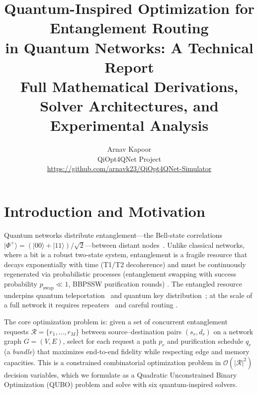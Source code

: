 \documentclass[10pt,a4paper]{article}
\begin{document}
\title{\textbf{Quantum-Inspired Optimization for Entanglement Routing\\
in Quantum Networks: A Technical Report\\
\large Full Mathematical Derivations, Solver Architectures,
and Experimental Analysis}}

\author{Arnav Kapoor\\
QiOpt4QNet Project\\
\url{https://github.com/arnavk23/QiOpt4QNet-Simulator}}

\maketitle

\tableofcontents
\newpage

\section{Introduction and Motivation}
\label{sec:intro}

Quantum networks distribute entanglement---the Bell-state correlations
$|\Phi^+\rangle = (|00\rangle + |11\rangle)/\sqrt{2}$---between distant
nodes~\cite{kimble2008quantum,wehner2018quantum,simon2017towards}.
Unlike classical networks, where a bit is a robust two-state
system, entanglement is a fragile resource that decays exponentially
with time (T1/T2 decoherence) and must be continuously regenerated via
probabilistic processes (entanglement swapping with success probability
$p_{\text{swap}} \ll 1$, BBPSSW purification rounds)
\cite{werner1989quantum,horodecki2009quantum}.  The entangled resource
underpins quantum teleportation~\cite{bennett1993teleporting} and
quantum key distribution~\cite{ekert1991quantum,gisin2002quantum,
scarani2009security,pirandola2020advances}; at the scale of a full
network it requires repeaters~\cite{briegel1998quantum,dur1999entanglement,
sangouard2011quantum,azuma2023quantum} and careful routing
\cite{pant2022routing,caleffi2017optimal,gyongyosi2019entanglement,
cuquet2009entanglement,schoute2016shortcuts,kozlowski2020designing}.

The core optimization problem is: given a set of concurrent
entanglement requests $\mathcal{R} = \{r_1, \dots, r_M\}$ between
source--destination pairs $(s_r, d_r)$ on a network graph
$G = (V, E)$, select for each request a path $p_r$ and purification
schedule $q_r$ (a \emph{bundle}) that maximizes end-to-end fidelity
while respecting edge and memory capacities.  This is a constrained
combinatorial optimization problem in $\mathcal{O}(|\mathcal{R}|^2)$
decision variables, which we formulate as a Quadratic Unconstrained
Binary Optimization (QUBO) problem
\cite{lucas2014ising,glover2019tutorial} and solve with six
quantum-inspired solvers.
\end{document}
